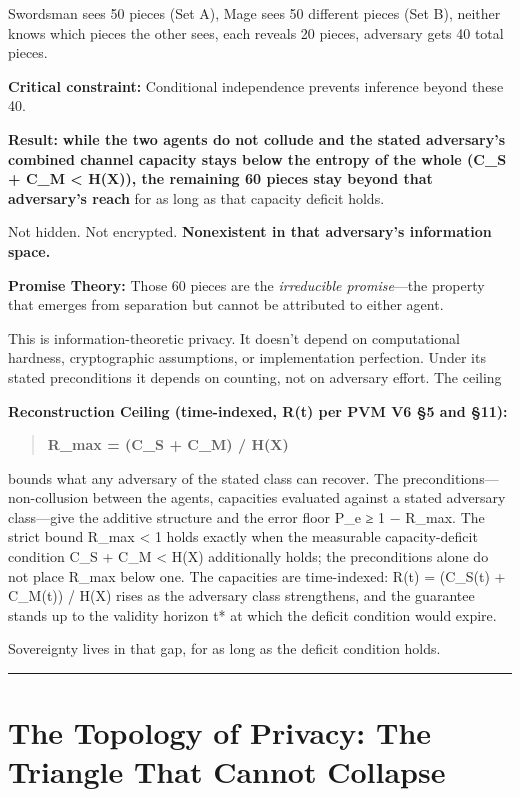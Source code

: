 \documentclass[
  11pt,
]{article}
\begin{document}
Swordsman sees 50 pieces (Set A), Mage sees 50 different pieces (Set B),
neither knows which pieces the other sees, each reveals 20 pieces,
adversary gets 40 total pieces.

\textbf{Critical constraint:} Conditional independence prevents
inference beyond these 40.

\textbf{Result:} \textbf{while the two agents do not collude and the
stated adversary's combined channel capacity stays below the entropy of
the whole (C\_S + C\_M \textless{} H(X)), the remaining 60 pieces stay
beyond that adversary's reach} for as long as that capacity deficit
holds.

Not hidden. Not encrypted. \textbf{Nonexistent in that adversary's
information space.}

\textbf{Promise Theory:} Those 60 pieces are the \emph{irreducible
promise}---the property that emerges from separation but cannot be
attributed to either agent.

This is information-theoretic privacy. It doesn't depend on
computational hardness, cryptographic assumptions, or implementation
perfection. Under its stated preconditions it depends on counting, not
on adversary effort. The ceiling

\textbf{Reconstruction Ceiling (time-indexed, R(t) per PVM V6 §5 and
§11):}

\begin{quote}
\textbf{R\_max = (C\_S + C\_M) / H(X)}
\end{quote}

bounds what any adversary of the stated class can recover. The
preconditions---non-collusion between the agents, capacities evaluated
against a stated adversary class---give the additive structure and the
error floor P\_e ≥ 1 − R\_max. The strict bound R\_max \textless{} 1
holds exactly when the measurable capacity-deficit condition C\_S + C\_M
\textless{} H(X) additionally holds; the preconditions alone do not
place R\_max below one. The capacities are time-indexed: R(t) = (C\_S(t)
+ C\_M(t)) / H(X) rises as the adversary class strengthens, and the
guarantee stands up to the validity horizon t* at which the deficit
condition would expire.

Sovereignty lives in that gap, for as long as the deficit condition
holds.

\begin{center}\rule{0.5\linewidth}{0.5pt}\end{center}

\section{The Topology of Privacy: The Triangle That Cannot
Collapse}\label{the-topology-of-privacy-the-triangle-that-cannot-collapse}
\end{document}
